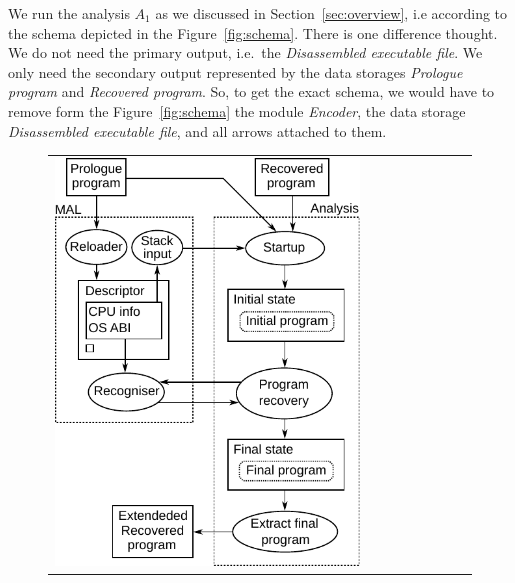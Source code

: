 \documentclass[10pt,twocolumn]{article}
\begin{document}
We run the analysis $ A_1 $ as we discussed in Section~\ref{sec:overview}, i.e
according to the schema depicted in the Figure~\ref{fig:schema}. There is one
difference thought. We do not need the primary output, i.e.~the
\emph{Disassembled executable file}. We only need the secondary output
represented by the data storages \emph{Prologue program} and \emph{Recovered
program}. So, to get the exact schema, we would have to remove form the
Figure~\ref{fig:schema} the module \emph{Encoder}, the data storage
\emph{Disassembled executable file}, and all arrows attached to them.

\begin{figure}[!ht]
\begin{center}
\begin{tabular}{ccc}
\includegraphics{./fig_schema_chaining}
& ~~~~~~~~~~~ &

\end{tabular}
\end{center}
\end{figure}
\end{document}
